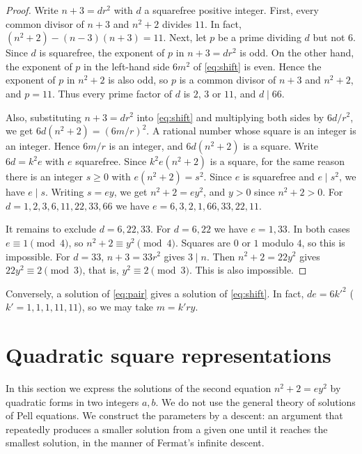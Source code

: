\documentclass[a4paper,11pt]{article}
\theoremstyle{plain}
\theoremstyle{definition}
\theoremstyle{remark}
\numberwithin{equation}{section}
\numberwithin{table}{section}
\begin{document}
\begin{proof}
Write $n+3=dr^2$ with $d$ a squarefree positive integer.
First, every common divisor of $n+3$ and $n^2+2$ divides $11$. In fact, $(n^2+2)-(n-3)(n+3)=11$.
Next, let $p$ be a prime dividing $d$ but not $6$. Since $d$ is squarefree, the exponent of $p$ in $n+3=dr^2$ is odd. On the other hand, the exponent of $p$ in the left-hand side $6m^2$ of \eqref{eq:shift} is even. Hence the exponent of $p$ in $n^2+2$ is also odd, so $p$ is a common divisor of $n+3$ and $n^2+2$, and $p=11$.
Thus every prime factor of $d$ is $2$, $3$ or $11$, and $d\mid66$.

Also, substituting $n+3=dr^2$ into \eqref{eq:shift} and multiplying both sides by $6d/r^2$, we get $6d(n^2+2)=(6m/r)^2$. A rational number whose square is an integer is an integer. Hence $6m/r$ is an integer, and $6d(n^2+2)$ is a square.
Write $6d=k^2e$ with $e$ squarefree. Since $k^2e(n^2+2)$ is a square, for the same reason there is an integer $s\ge0$ with $e(n^2+2)=s^2$.
Since $e$ is squarefree and $e\mid s^2$, we have $e\mid s$. Writing $s=ey$, we get $n^2+2=ey^2$, and $y>0$ since $n^2+2>0$.
For $d=1,2,3,6,11,22,33,66$ we have $e=6,3,2,1,66,33,22,11$.

It remains to exclude $d=6,22,33$.
For $d=6,22$ we have $e=1,33$. In both cases $e\equiv1\pmod4$, so $n^2+2\equiv y^2\pmod4$. Squares are $0$ or $1$ modulo $4$, so this is impossible.
For $d=33$, $n+3=33r^2$ gives $3\mid n$. Then $n^2+2=22y^2$ gives $22y^2\equiv2\pmod3$, that is, $y^2\equiv2\pmod3$. This is also impossible.
\end{proof}

Conversely, a solution of \eqref{eq:pair} gives a solution of \eqref{eq:shift}. In fact, $de=6k'^2$ ($k'=1,1,1,11,11$), so we may take $m=k'ry$.

\section{Quadratic square representations}\label{sec:parameters}

In this section we express the solutions of the second equation $n^2+2=ey^2$ by quadratic forms in two integers $a,b$.
We do not use the general theory of solutions of Pell equations. We construct the parameters by a descent: an argument that repeatedly produces a smaller solution from a given one until it reaches the smallest solution, in the manner of Fermat's infinite descent.
\end{document}
